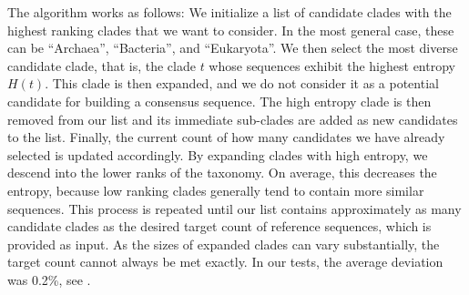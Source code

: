 The algorithm works as follows:
We initialize a list of candidate clades with the highest ranking clades that we want to consider.
In the most general case, these can be ``Archaea'',  ``Bacteria'', and ``Eukaryota''.
We then select the most diverse candidate clade, that is,
the clade $t$ whose sequences exhibit the highest entropy $H(t)$.
This clade is then expanded,
and we do not consider it as a potential candidate for building a consensus sequence.
The high entropy clade is then removed from our list and its immediate sub-clades are added as new candidates to the list.
Finally, the current count of how many candidates we have already selected is updated accordingly.
By expanding clades with high entropy, we descend into the lower ranks of the taxonomy.
On average, this decreases the entropy,
because low ranking clades generally tend to contain more similar sequences.
This process is repeated until our list contains approximately as many candidate clades
as the desired target count of reference sequences, which is provided as input.
As the sizes of expanded clades can vary substantially, the target count cannot always be met exactly.
In our tests, the average deviation was \num{0.2}\%, see .



